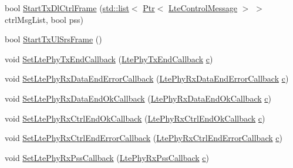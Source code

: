 \begin{DoxyCompactItemize}
\item 
bool \hyperlink{classns3_1_1LteSpectrumPhy_aa8675acfda41553709799a9af7bb0b1c}{Start\+Tx\+Dl\+Ctrl\+Frame} (\hyperlink{openflow-interface_8h_afd9bcfa176617760671b67580f536fa7}{std\+::list}$<$ \hyperlink{classns3_1_1Ptr}{Ptr}$<$ \hyperlink{classns3_1_1LteControlMessage}{Lte\+Control\+Message} $>$ $>$ ctrl\+Msg\+List, bool pss)
\item 
bool \hyperlink{classns3_1_1LteSpectrumPhy_aea6bcc7e1aae88e314abe2db3d63f61b}{Start\+Tx\+Ul\+Srs\+Frame} ()
\item 
void \hyperlink{classns3_1_1LteSpectrumPhy_ad4cf59d84d8ab329259d8304e53bc0c5}{Set\+Lte\+Phy\+Tx\+End\+Callback} (\hyperlink{namespacens3_a24fd770b1dd6581414512d03661ca44c}{Lte\+Phy\+Tx\+End\+Callback} \hyperlink{mmwave_2model_2fading-traces_2fading__trace__generator_8m_ae0323a9039add2978bf5b49550572c7c}{c})
\item 
void \hyperlink{classns3_1_1LteSpectrumPhy_a5ac90b3dc1cdf5bc89fb9faa2a4a4dd6}{Set\+Lte\+Phy\+Rx\+Data\+End\+Error\+Callback} (\hyperlink{namespacens3_a7b967f2fed4d92f6ec8a607ac493c535}{Lte\+Phy\+Rx\+Data\+End\+Error\+Callback} \hyperlink{mmwave_2model_2fading-traces_2fading__trace__generator_8m_ae0323a9039add2978bf5b49550572c7c}{c})
\item 
void \hyperlink{classns3_1_1LteSpectrumPhy_a7199a6d693470878090d9f6c4388128f}{Set\+Lte\+Phy\+Rx\+Data\+End\+Ok\+Callback} (\hyperlink{namespacens3_aeb73b95892e5c82bf5dd9e7f393ebc7a}{Lte\+Phy\+Rx\+Data\+End\+Ok\+Callback} \hyperlink{mmwave_2model_2fading-traces_2fading__trace__generator_8m_ae0323a9039add2978bf5b49550572c7c}{c})
\item 
void \hyperlink{classns3_1_1LteSpectrumPhy_af57b1c89c3ca47abf91de25668bd2fdc}{Set\+Lte\+Phy\+Rx\+Ctrl\+End\+Ok\+Callback} (\hyperlink{namespacens3_a75b47d60a00f06fe21b43f872bc22bb9}{Lte\+Phy\+Rx\+Ctrl\+End\+Ok\+Callback} \hyperlink{mmwave_2model_2fading-traces_2fading__trace__generator_8m_ae0323a9039add2978bf5b49550572c7c}{c})
\item 
void \hyperlink{classns3_1_1LteSpectrumPhy_a9806393a491b8af94632db472c038237}{Set\+Lte\+Phy\+Rx\+Ctrl\+End\+Error\+Callback} (\hyperlink{namespacens3_a097aded14de04bf7d1df0316fa68a175}{Lte\+Phy\+Rx\+Ctrl\+End\+Error\+Callback} \hyperlink{mmwave_2model_2fading-traces_2fading__trace__generator_8m_ae0323a9039add2978bf5b49550572c7c}{c})
\item 
void \hyperlink{classns3_1_1LteSpectrumPhy_a3f4a4483e008fa06689dfe723e6146ff}{Set\+Lte\+Phy\+Rx\+Pss\+Callback} (\hyperlink{namespacens3_a8ac519df0b71201cdd5848027df6d367}{Lte\+Phy\+Rx\+Pss\+Callback} \hyperlink{mmwave_2model_2fading-traces_2fading__trace__generator_8m_ae0323a9039add2978bf5b49550572c7c}{c})

\end{DoxyCompactItemize}
